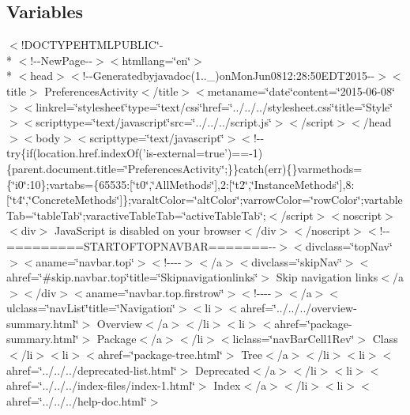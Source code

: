 \subsection*{Variables}
\begin{DoxyCompactItemize}
\item 
$<$!D\-O\-C\-T\-Y\-P\-E\-H\-T\-M\-L\-P\-U\-B\-L\-I\-C\char`\"{}-\/\\*
$<$!-\/-\/New\-Page-\/-\/$>$$<$htmllang=\char`\"{}en\char`\"{}$>$\\*
$<$head$>$$<$!-\/-\/Generatedbyjavadoc(1..\-\_)on\-Mon\-Jun0812\-:28\-:50\-E\-D\-T2015-\/-\/$>$$<$title$>$ Preferences\-Activity$<$/title$>$$<$metaname=\char`\"{}date\char`\"{}content=\char`\"{}2015-\/06-\/08\char`\"{}$>$$<$linkrel=\char`\"{}stylesheet\char`\"{}type=\char`\"{}text/css\char`\"{}href=\char`\"{}../../../stylesheet.\-css\char`\"{}title=\char`\"{}\-Style\char`\"{}$>$$<$scripttype=\char`\"{}text/javascript\char`\"{}src=\char`\"{}../../../script.\-js\char`\"{}$>$$<$/script$>$$<$/head$>$$<$body$>$$<$scripttype=\char`\"{}text/javascript\char`\"{}$>$$<$!-\/-\/try\{if(location.\-href.\-index\-Of('is-\/external=true')==-\/1)\{parent.\-document.\-title=\char`\"{}\-Preferences\-Activity\char`\"{};\}\}catch(err)\{\}varmethods=\{\char`\"{}i0\char`\"{}\-:10\};vartabs=\{65535\-:\mbox{[}\char`\"{}t0\char`\"{},\char`\"{}\-All\-Methods\char`\"{}\mbox{]},2\-:\mbox{[}\char`\"{}t2\char`\"{},\char`\"{}\-Instance\-Methods\char`\"{}\mbox{]},8\-:\mbox{[}\char`\"{}t4\char`\"{},\char`\"{}\-Concrete\-Methods\char`\"{}\mbox{]}\};varalt\-Color=\char`\"{}alt\-Color\char`\"{};varrow\-Color=\char`\"{}row\-Color\char`\"{};vartable\-Tab=\char`\"{}table\-Tab\char`\"{};varactive\-Table\-Tab=\char`\"{}active\-Table\-Tab\char`\"{};$<$/script$>$$<$noscript$>$$<$div$>$ Java\-Script is disabled on your browser$<$/div$>$$<$/noscript$>$$<$!-\/-\/=========\-S\-T\-A\-R\-T\-O\-F\-T\-O\-P\-N\-A\-V\-B\-A\-R=======-\/-\/$>$$<$divclass=\char`\"{}top\-Nav\char`\"{}$>$$<$aname=\char`\"{}navbar.\-top\char`\"{}$>$$<$!-\/-\/-\/-\/$>$$<$/a$>$$<$divclass=\char`\"{}skip\-Nav\char`\"{}$>$$<$ahref=\char`\"{}\#skip.\-navbar.\-top\char`\"{}title=\char`\"{}\-Skipnavigationlinks\char`\"{}$>$ Skip navigation links$<$/a$>$$<$/div$>$$<$aname=\char`\"{}navbar.\-top.\-firstrow\char`\"{}$>$$<$!-\/-\/-\/-\/$>$$<$/a$>$$<$ulclass=\char`\"{}nav\-List\char`\"{}title=\char`\"{}\-Navigation\char`\"{}$>$$<$li$>$$<$ahref=\char`\"{}../../../overview-\/summary.\-html\char`\"{}$>$ Overview$<$/a$>$$<$/li$>$$<$li$>$$<$ahref=\char`\"{}package-\/summary.\-html\char`\"{}$>$ Package$<$/a$>$$<$/li$>$$<$liclass=\char`\"{}nav\-Bar\-Cell1\-Rev\char`\"{}$>$ Class$<$/li$>$$<$li$>$$<$ahref=\char`\"{}package-\/tree.\-html\char`\"{}$>$ Tree$<$/a$>$$<$/li$>$$<$li$>$$<$ahref=\char`\"{}../../../deprecated-\/list.\-html\char`\"{}$>$ Deprecated$<$/a$>$$<$/li$>$$<$li$>$$<$ahref=\char`\"{}../../../index-\/files/index-\/1.\-html\char`\"{}$>$ Index$<$/a$>$$<$/li$>$$<$li$>$$<$ahref=\char`\"{}../../../help-\/doc.\-html\char`\"{}$>$ $$
\end{DoxyCompactItemize}
